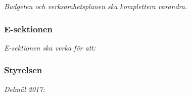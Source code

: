 \documentclass[../_main/handlingar.tex]{subfiles}
\begin{document}

\emph{Budgeten och verksamhetsplanen ska komplettera varandra.}

\subsubsection*{E-sektionen}
\emph{E-sektionen ska verka för att:}
\begin{dashlist}
\end{dashlist}

\subsubsection*{Styrelsen}

\emph{Delmål 2017:}
\begin{dashlist}
\end{dashlist}

\newpage
\end{document}
